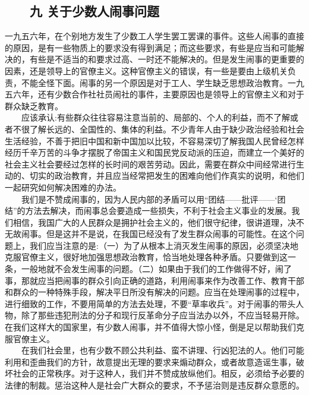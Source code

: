 \documentclass[cn,11pt,chinese]{elegantbook}
\def\myformat#1{\hfil\hfil #1}
\begin{document}
\subsection*{\myformat{　　九 关于少数人闹事问题}}
一九五六年，在个别地方发生了少数工人学生罢工罢课的事件。这些人闹事的直接的原因，是有一些物质上的要求没有得到满足；而这些要求，有些是应当和可能解决的，有些是不适当的和要求过高、一时还不能解决的。但是发生闹事的更重要的因素，还是领导上的官僚主义。这种官僚主义的错误，有一些是要由上级机关负责，不能全怪下面。闹事的另一个原因是对于工人、学生缺乏思想政治教育。一九五六年，还有少数合作社社员闹社的事件，主要原因也是领导上的官僚主义和对于群众缺乏教育。\\
　　应该承认:有些群众往往容易注意当前的、局部的、个人的利益，而不了解或者不很了解长远的、全国性的、集体的利益。不少青年人由于缺少政治经验和社会生活经验，不善于把旧中国和新中国加以比较，不容易深切了解我国人民曾经怎样经历千辛万苦的斗争才摆脱了帝国主义和国民党反动派的压迫，而建立一个美好的社会主义社会要经过怎样的长时间的艰苦劳动。因此，需要在群众中间经常进行生动的、切实的政治教育，并且应当经常把发生的困难向他们作真实的说明，和他们一起研究如何解决困难的办法。\\
　　我们是不赞成闹事的，因为人民内部的矛盾可以用“团结——批评——‘团结”的方法去解决，而闹事总会要造成一些损失，不利于社会主义事业的发展。我们相信，我国广大的人民群众是拥护社会主义的，他们很守纪律，很讲道理，决不无故闹事。但是这并不是说，在我国已经没有了发生群众闹事的可能性。在这个问题上，我们应当注意的是:（一）为了从根本上消灭发生闹事的原因，必须坚决地克服官僚主义，很好地加强思想政治教育，恰当地处理各种矛盾。只要做到这一条，一般地就不会发生闹事的问题。（二）如果由于我们的工作做得不好，闹了事，那就应当把闹事的群众引向正确的道路，利用闹事来作为改善工作、教育干部和群众的一种特殊手段，解决平日所没有解决的问题。应当在处理闹事的过程中，进行细致的工作，不要用简单的方法去处理，不要“草率收兵”。对于闹事的带头人物，除了那些违犯刑法的分子和现行反革命分子应当法办以外，不应当轻易开除。在我们这样大的国家里，有少数人闹事，并不值得大惊小怪，倒是足以帮助我们克服官僚主义。\\
　　在我们社会里，也有少数不顾公共利益、蛮不讲理、行凶犯法的人。他们可能利用和歪曲我们的方针，故意提出无理的要求来煽动群众，或者故意造谣生事，破坏社会的正常秩序。对于这种人，我们并不赞成放纵他们。相反，必须给予必要的法律的制裁。惩治这种人是社会广大群众的要求，不予惩治则是违反群众意愿的。\\
\end{document}
